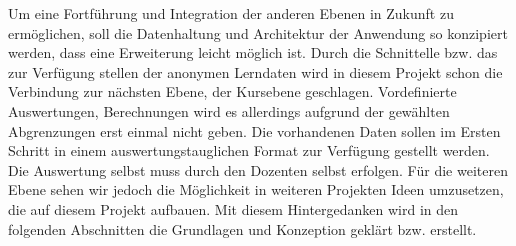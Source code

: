 Um eine Fortführung und Integration der anderen Ebenen in Zukunft zu ermöglichen, soll die Datenhaltung und Architektur der Anwendung so konzipiert werden, dass eine Erweiterung leicht möglich ist.
Durch die Schnittelle bzw. das zur Verfügung stellen der anonymen Lerndaten wird in diesem Projekt schon die Verbindung zur nächsten Ebene, der Kursebene geschlagen.
Vordefinierte Auswertungen, Berechnungen wird es allerdings aufgrund der gewählten Abgrenzungen erst einmal nicht geben.
Die vorhandenen Daten sollen im Ersten Schritt in einem auswertungstauglichen Format zur Verfügung gestellt werden.
Die Auswertung selbst muss durch den Dozenten selbst erfolgen.
Für die weiteren Ebene sehen wir jedoch die Möglichkeit in weiteren Projekten Ideen umzusetzen, die auf diesem Projekt aufbauen.
Mit diesem Hintergedanken wird in den folgenden Abschnitten die Grundlagen und Konzeption geklärt bzw. erstellt.
